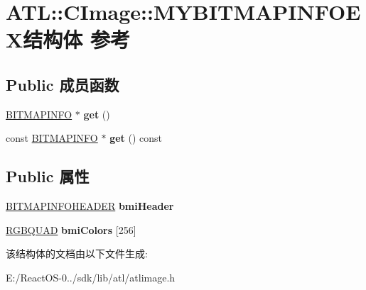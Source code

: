 \hypertarget{struct_a_t_l_1_1_c_image_1_1_m_y_b_i_t_m_a_p_i_n_f_o_e_x}{}\section{A\+TL\+:\+:C\+Image\+:\+:M\+Y\+B\+I\+T\+M\+A\+P\+I\+N\+F\+O\+E\+X结构体 参考}
\label{struct_a_t_l_1_1_c_image_1_1_m_y_b_i_t_m_a_p_i_n_f_o_e_x}
\subsection*{Public 成员函数}
\begin{DoxyCompactItemize}
\item 
\mbox{\label{struct_a_t_l_1_1_c_image_1_1_m_y_b_i_t_m_a_p_i_n_f_o_e_x_af12a339cf339a60963a80b1eabe928ed}} 
\hyperlink{structtag_b_i_t_m_a_p_i_n_f_o}{B\+I\+T\+M\+A\+P\+I\+N\+FO} $\ast$ {\bfseries get} ()
\item 
\mbox{\label{struct_a_t_l_1_1_c_image_1_1_m_y_b_i_t_m_a_p_i_n_f_o_e_x_a7e021b79541f5889c76623015cdfb027}} 
const \hyperlink{structtag_b_i_t_m_a_p_i_n_f_o}{B\+I\+T\+M\+A\+P\+I\+N\+FO} $\ast$ {\bfseries get} () const
\end{DoxyCompactItemize}
\subsection*{Public 属性}
\begin{DoxyCompactItemize}
\item 
\mbox{\label{struct_a_t_l_1_1_c_image_1_1_m_y_b_i_t_m_a_p_i_n_f_o_e_x_ac7f8a064e9ca96e577c19222e224eeb7}} 
\hyperlink{struct_b_i_t_m_a_p_i_n_f_o_h_e_a_d_e_r}{B\+I\+T\+M\+A\+P\+I\+N\+F\+O\+H\+E\+A\+D\+ER} {\bfseries bmi\+Header}
\item 
\mbox{\label{struct_a_t_l_1_1_c_image_1_1_m_y_b_i_t_m_a_p_i_n_f_o_e_x_ae82978b57a679e0ee7b06241b376e84c}} 
\hyperlink{structtag_r_g_b_q_u_a_d}{R\+G\+B\+Q\+U\+AD} {\bfseries bmi\+Colors} \mbox{[}256\mbox{]}
\end{DoxyCompactItemize}


该结构体的文档由以下文件生成\+:\begin{DoxyCompactItemize}
\item 
E\+:/\+React\+O\+S-\/0../sdk/lib/atl/atlimage.\+h\end{DoxyCompactItemize}
